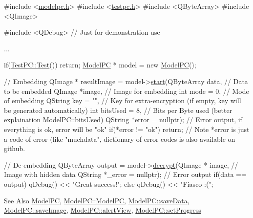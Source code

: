 \begin{DoxyCode}
\textcolor{preprocessor}{#include <\hyperlink{modelpc_8h}{modelpc.h}>}
\textcolor{preprocessor}{#include <\hyperlink{testpc_8h}{testpc.h}>}
\textcolor{preprocessor}{#include <QByteArray>}
\textcolor{preprocessor}{#include <QImage>}

\textcolor{preprocessor}{#include <QDebug>} \textcolor{comment}{// Just for demonstration use}

...

if(\hyperlink{class_test_p_c_adec99ddd8910d45b6aca0a105f44960e}{TestPC::Test}())
    \textcolor{keywordflow}{return};
\hyperlink{class_model_p_c}{ModelPC} * model = \textcolor{keyword}{new} \hyperlink{class_model_p_c}{ModelPC}();

\textcolor{comment}{// Embedding}
QImage * resultImage = model->\hyperlink{class_model_p_c_a3cae34fd5bcb06e8c1f8cfe7961bd270}{start}(QByteArray data, \textcolor{comment}{// Data to be embedded}
                                    QImage *image, \textcolor{comment}{// Image for embedding}
                                    \textcolor{keywordtype}{int} mode = 0, \textcolor{comment}{// Mode of embedding}
                                    QString key = \textcolor{stringliteral}{""}, \textcolor{comment}{// Key for extra-encryption (if empty, key will be
       generated automatically)}
                                    \textcolor{keywordtype}{int} bitsUsed = 8, \textcolor{comment}{// Bits per Byte used (better explaination
       ModelPC::bitsUsed)}
                                    QString *error = \textcolor{keyword}{nullptr}); \textcolor{comment}{// Error output, if everything is ok, error
       will be "ok"}
\textcolor{keywordflow}{if}(*error != \textcolor{stringliteral}{"ok"})
    \textcolor{keywordflow}{return};
\textcolor{comment}{// Note *error is just a code of error (like "muchdata", dictionary of error codes is also available on
       github.}

\textcolor{comment}{// De-embedding}
QByteArray output = model->\hyperlink{class_model_p_c_a9458c3a1e369a64889d9a1f70e0c1d18}{decrypt}(QImage * image, \textcolor{comment}{// Image with hidden data}
                                   QString *\_error = \textcolor{keyword}{nullptr}); \textcolor{comment}{// Error output}
\textcolor{keywordflow}{if}(data == output)
   qDebug() << \textcolor{stringliteral}{"Great success!"};
\textcolor{keywordflow}{else}
   qDebug() << \textcolor{stringliteral}{"Fiasco :("};
\end{DoxyCode}
 \begin{DoxySeeAlso}{See Also}
\hyperlink{class_model_p_c}{Model\-P\-C}, \hyperlink{class_model_p_c_ae12ebe65ec973c02a0de4850a7c1e31c}{Model\-P\-C\-::\-Model\-P\-C}, \hyperlink{class_model_p_c_a0855107fb0ccc247cd9e893fae9bb08a}{Model\-P\-C\-::save\-Data}, \hyperlink{class_model_p_c_a41f5e2e8022679046e4d3fa1109025fa}{Model\-P\-C\-::save\-Image}, \hyperlink{class_model_p_c_af0217a7ca5671e26090dc50a5dccdaf5}{Model\-P\-C\-::alert\-View}, \hyperlink{class_model_p_c_afdcd80f0ed5062e145a71f09b0897547}{Model\-P\-C\-::set\-Progress}
\end{DoxySeeAlso}
